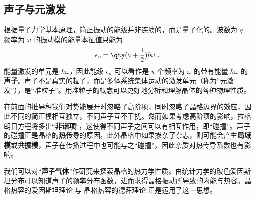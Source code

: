 \subsection{声子与元激发}

根据量子力学基本原理，简正振动的能级并非连续的，而是量子化的。波数为 $q$ 频率为 $\omega$ 的振动模的能量本征值只能为
\begin{equation}
\epsilon_n=\qty(n+\frac{1}{2})\hbar\omega~.
\end{equation}
能量激发的单元是 $\hbar\omega$，因此能级 $\epsilon_n$ 可以看作是 $n$ 个频率为 $\omega$ 的带有能量 $\hbar\omega$ 的\textbf{声子}。声子不是真实的粒子，而是多体系统集体运动的激发单元（称为“元激发”），是“准粒子”。用准粒子的概念可以更好地分析和理解晶体的各种物理性质。

在前面的推导种我们对势能展开时忽略了高阶项，同时忽略了晶格边界的效应，因此不同的简正模相互独立，不同声子互不干扰。然而如果考虑高阶项的影响，拉格朗日方程将多出“\textbf{非谐项}”，这使得不同声子之间可以有相互作用，即“碰撞”。声子的碰撞正是晶格的\textbf{热传导}的原因。此外晶格中如果掺杂了杂志，则可能会产生\textbf{局域模}或\textbf{共振模}，声子在传播过程中也可能与之“碰撞”，因此杂质对热传导系数也有影响。

我们可以对“\textbf{声子气体}”作研究来探索晶格的热力学性质。由统计力学的玻色爱因斯坦分布可以知道声子的频率分布函数，进而求得晶格振动所导致的内能与热容。晶格热容的爱因斯坦理论 与 晶格热容的德拜理论 正是运用了这一思想。